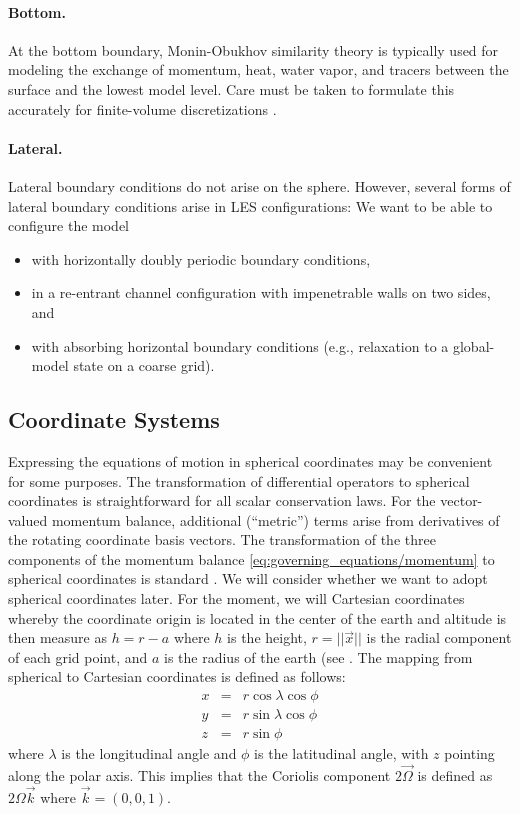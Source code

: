 \documentclass{article}
\begin{document}
\paragraph{Bottom.} At the bottom boundary, Monin-Obukhov similarity theory is typically used for modeling the exchange of momentum, heat, water vapor, and tracers between the surface and the lowest model level. Care must be taken to formulate this accurately for finite-volume discretizations  \citep{Nishizawa18a}.

\paragraph{Lateral.} Lateral boundary conditions do not arise on the sphere. However, several forms of lateral boundary conditions arise in LES configurations: We want to be able to configure the model
\begin{itemize}
    \item with horizontally doubly periodic boundary conditions,
    \item in a re-entrant channel configuration with impenetrable walls on two sides, and 
    \item with absorbing horizontal boundary conditions (e.g., relaxation to a global-model state on a coarse grid). 
\end{itemize}

\subsection{Coordinate Systems}

Expressing the equations of motion in spherical coordinates may be convenient for some purposes. The transformation of differential operators to spherical coordinates is straightforward for all scalar conservation laws. For the vector-valued momentum balance, additional (``metric'') terms arise from derivatives of the rotating coordinate basis vectors. The transformation of the three components of the momentum balance \eqref{eq:governing_equations/momentum} to spherical coordinates is standard \citep[e.g.,][]{Staniforth03a}. We will consider whether we want to adopt spherical coordinates later. For the moment, we will Cartesian coordinates whereby the coordinate origin is located in the center of the earth and altitude is then measure as $h=r-a$ where $h$ is the height, $r=||\vec{x}||$ is the radial component of each grid point, and $a$ is the radius of the earth (see \cite{giraldo:2001,giraldo:2002,giraldo:2013}. The mapping from spherical to Cartesian coordinates is defined as follows:
\begin{eqnarray*}
x &=& r \cos \lambda \cos \phi\\
y &=& r \sin \lambda \cos \phi \\
z &=& r \sin \phi
\end{eqnarray*}
where $\lambda$ is the longitudinal angle and $\phi$ is the latitudinal angle, with $z$ pointing along the polar axis. This implies that the Coriolis component $2 \vec{\Omega}$ is defined as $2 \Omega \vec{k}$ where $\vec{k}=(0,0,1)$.
\end{document}
